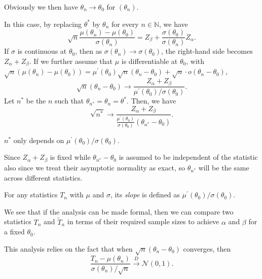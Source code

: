 \begin{note}
	Obviously we then have \(\theta _n \to \theta _0\) for \((\theta _n)\).
\end{note}

In this case, by replacing \(\theta ^{\ast} \) by \(\theta _n\) for every \(n \in \mathbb{N} \), we have
\[
	\sqrt{n} \frac{\mu (\theta _n) - \mu (\theta _0)}{\sigma (\theta _n)}
	= Z_\beta + \frac{\sigma (\theta _0)}{\sigma (\theta _n)} Z_\alpha.
\]
If \(\sigma \) is continuous at \(\theta _0\), then as \(\sigma (\theta _n) \to \sigma (\theta _0)\), the right-hand side becomes \(Z_\alpha + Z_\beta \). If we further assume that \(\mu \) is differentiable at \(\theta _0\), with \(\sqrt{n} (\mu (\theta _n) - \mu (\theta _0)) = \mu ^{\prime} (\theta _0) \sqrt{n} (\theta _n - \theta _0) + \sqrt{n} \cdot o(\theta _n - \theta _0)\),
\[
	\sqrt{n} (\theta _n - \theta _0)
	\to \frac{Z_\alpha + Z_\beta }{\mu ^{\prime} (\theta _0) / \sigma (\theta _0)}.
\]
Let \(n^{\ast} \) be the \(n\) such that \(\theta _{n^{\ast} } = \theta _n = \theta ^{\ast} \). Then, we have
\[
	\sqrt{n^{\ast} }
	\to \frac{Z_\alpha + Z_\beta }{\frac{\mu ^{\prime} (\theta _0)}{\sigma (\theta _0)} (\theta _{n^{\ast} } - \theta _0)}.
\]

\begin{note}
	\(n^{\ast} \) only depends on \(\mu ^{\prime} (\theta _0) / \sigma (\theta _0)\).
\end{note}
\begin{explanation}
	Since \(Z_\alpha + Z_\beta \) is fixed while \(\theta _{n^{\ast} } - \theta _0\) is assumed to be independent of the statistic also since we treat their asymptotic normality as exact, so \(\theta _{n^{\ast} }\) will be the same across different statistics.
\end{explanation}

\begin{definition}[Slope]\label{def:slope}
	For any statistics \(T_n\) with \(\mu \) and \(\sigma \), its \emph{slope} is defined as  \(\mu ^{\prime} (\theta _0) / \sigma (\theta _0)\).
\end{definition}

We see that if the analysis can be made formal, then we can compare two statistics \(T_n\) and \(\widetilde{T} _n\) in terms of their required sample sizes to achieve \(\alpha \) and \(\beta \) for a fixed \(\theta _0\).

\begin{remark}
	This analysis relies on the fact that when \(\sqrt{n} (\theta _n - \theta _0)\) converges, then
	\[
		\frac{T_n - \mu (\theta _n)}{\sigma (\theta _n) / \sqrt{n} } \overset{D}{\to} \mathcal{N} (0, 1).
	\]
\end{remark}